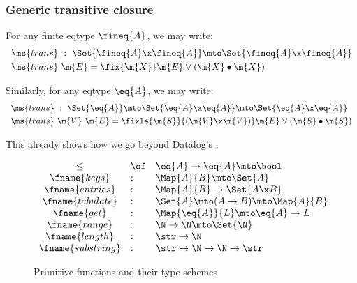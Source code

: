 \documentclass[preprint]{sigplanconf}
\newcommand{\uto}{\to}
\begin{document}
\subsubsection{Generic transitive closure}

For any finite eqtype $\fineq{A}$, we may write:
\[\begin{array}{l}
\ms{trans} ~:~ \Set{\fineq{A} \x \fineq{A}} \mto \Set{\fineq{A} \x \fineq{A}}
\vspace{0.3em}\\
\ms{trans}\ \m{E} = \fix{\m{X}} \m{E} \vee (\m{X} \bullet \m{X})
\end{array}\]

\noindent Similarly, for any eqtype $\eq{A}$, we may write:
\[\begin{array}{l}
\ms{trans} ~:~
\Set{\eq{A}} \mto \Set{\eq{A} \x \eq{A}} \mto \Set{\eq{A} \x \eq{A}}
\vspace{0.3em}\\
\ms{trans}\ \m{V}\ \m{E} = %
\fixle{\m{S}}{(\m{V} \x \m{V})} \m{E} \vee (\m{S} \bullet \m{S})
\end{array}\]

\TODO This already shows how we go beyond Datalog's .


\begin{figure}
  \[\begin{array}{cll}
  \le &\of& \eq{A} \uto \eq{A} \mto \bool\\
  \fname{keys}     &:& \Map{A}{B} \mto \Set{A}\\
  \fname{entries}  &:& \Map{A}{B} \uto \Set{A \x B}\\
  \fname{tabulate} &:& \Set{A} \mto (A \to B) \mto \Map{A}{B}\\
  \fname{get}      &:& \Map{\eq{A}}{L} \mto \eq{A} \uto L\\
  \fname{range}    &:& \N \uto \N \mto \Set{\N}\\
  \fname{length}   &:& \str \uto \N\\
  \fname{substring} &:& \str \uto \N \uto \N \uto \str
  \end{array}\]
  \caption{Primitive functions and their type schemes}
\end{figure}
\end{document}
